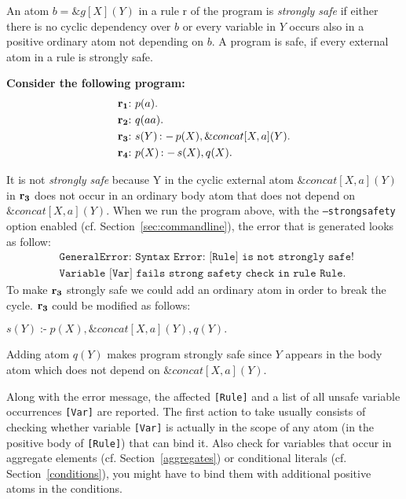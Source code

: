 \documentclass[a4paper, titlepage]{article}
\newcommand{\ext}[3]{\ensuremath{\&{#1}[#2](#3)}}
\DeclareMathOperator{\leftimpl}{:-}
\newcommand\mycenterline[1]{\par\smallskip\centerline{#1} \smallskip}
\newcommand{\row}[1]{%
  \ensuremath{\color{black}\ensuremath{\mathbf{#1}} \color{black}}%
}
\newcommand{\rowprefix}[1]{%
  \ensuremath{\color{black}\mathbf{#1{:}}\ }%
}
\begin{document}
An atom $b=\ext{g}{X}{Y}$ in a rule r of the program is \emph{strongly safe} if either there is no cyclic dependency over $b$   or every variable in $Y$ occurs also in a positive ordinary atom not depending on $b$. A program is safe, if every external atom in a rule is strongly safe. 


\begin{exmp} \textbf{Consider the following program:}
\label{strongSafetyExmp}
\begin{align*}
& \rowprefix{r_1} p(a). \\
& \rowprefix{r_2} q(aa). \\
& \rowprefix{r_3} s(Y) \leftimpl p(X), \ext{concat}{X,a}{Y}. \\
& \rowprefix{r_4} p(X) \leftimpl s(X), q(X).
\end{align*}
\end{exmp}
It is not \emph{strongly safe} because Y in the cyclic external atom $\ext{concat}{X,a}{Y}$ in $\row{r_3}$ does not occur in an
ordinary body atom that does not depend on 
\\$\ext{concat}{X,a}{Y}$. When we run the program above, with the \texttt{--strongsafety} option enabled (cf. Section~\ref{sec:commandline}), the error that is generated looks as follow:
\begin{align*}
& \texttt{GeneralError: Syntax Error: [Rule] is not strongly safe! }  \\
& \texttt{Variable [Var] fails strong safety check in rule Rule.}
\end{align*}
To make $\row{r_3}$ strongly safe we could add an ordinary atom in order to break the cycle. $\row{r_3}$ could be modified as follows: \\ \mycenterline{$s(Y) \leftimpl p(X), \ext{concat}{X,a}{Y},q(Y).$} Adding atom $q(Y)$ makes program strongly safe since $Y$ appears in the body atom which does not depend on $\ext{concat}{X,a}{Y}$.
 
Along with the error message, the affected \texttt{[Rule]} and a list of all unsafe variable occurrences \texttt{[Var]} are reported. 
The first action to take usually consists of checking whether variable \texttt{[Var]} is actually in the scope of any atom (in the positive body of \texttt{[Rule]}) that can bind it. Also check for variables that occur in aggregate elements (cf. Section~\ref{aggregates}) or conditional literals (cf. Section~\ref{conditions}), you might have to bind them with additional positive atoms in the conditions. 
\end{document}
